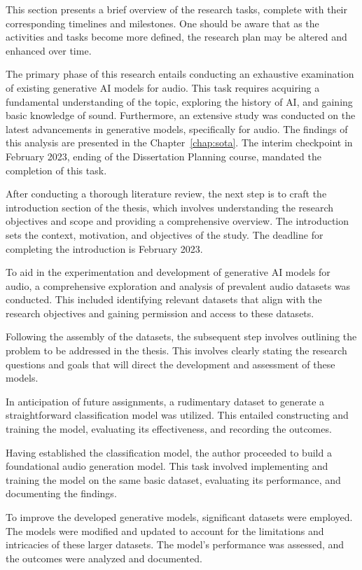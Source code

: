 This section presents a brief overview of the research tasks, complete with their corresponding timelines and milestones. One should be aware that as the activities and tasks become more defined, the research plan may be altered and enhanced over time.

The primary phase of this research entails conducting an exhaustive examination of existing generative \ac{AI} models for audio. This task requires acquiring a fundamental understanding of the topic, exploring the history of \ac{AI}, and gaining basic knowledge of sound. Furthermore, an extensive study was conducted on the latest advancements in generative models, specifically for audio. The findings of this analysis are presented in the Chapter~\ref{chap:sota}. The interim checkpoint in February 2023, ending of the Dissertation Planning course, mandated the completion of this task.

After conducting a thorough literature review, the next step is to craft the introduction section of the thesis, which involves understanding the research objectives and scope and providing a comprehensive overview. The introduction sets the context, motivation, and objectives of the study. The deadline for completing the introduction is February 2023. 

To aid in the experimentation and development of generative \ac{AI} models for audio, a comprehensive exploration and analysis of prevalent audio datasets was conducted. This included identifying relevant datasets that align with the research objectives and gaining permission and access to these datasets.

Following the assembly of the datasets, the subsequent step involves outlining the problem to be addressed in the thesis. This involves clearly stating the research questions and goals that will direct the development and assessment of these models.

In anticipation of future assignments, a rudimentary dataset to generate a straightforward classification model was utilized. This entailed constructing and training the model, evaluating its effectiveness, and recording the outcomes.

Having established the classification model, the author proceeded to build a foundational audio generation model. This task involved implementing and training the model on the same basic dataset, evaluating its performance, and documenting the findings.

To improve the developed generative models, significant datasets were employed. The models were modified and updated to account for the limitations and intricacies of these larger datasets. The model's performance was assessed, and the outcomes were analyzed and documented.

